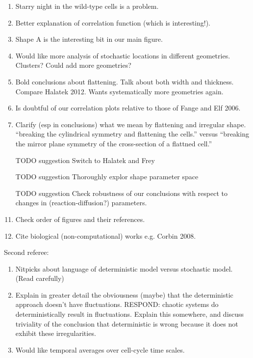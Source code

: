 \documentclass[letterpaper,twocolumn,amsmath,amssymb,pre]{revtex4-1}
\begin{document}
{\begin{enumerate}
    \emph{If you can't make it grow in a .3 micron (rigid) silicon channel,
      then we and you observe it growing in a .25 micron flexible
      channel, it presumably must be able to grow because it deformed
      the channel to larger than .3 microns.}
  \item Starry night in the wild-type cells is a problem.
  \item Better explanation of correlation function (which is
    interesting!).
  \item Shape A is the interesting bit in our main figure.
  \item Would like more analysis of stochastic locations in different
    geometries.  Clusters?  Could add more geometries?
  \item Bold conclusions about flattening.  Talk about both width and
    thickness.  Compare Halatek 2012.  Wants systematically more
    geometries again.
  \item Is doubtful of our correlation plots relative to those of
    Fange and Elf 2006.
  \item Clarify (esp in conclusions) what we mean by flattening and
    irregular shape.  ``breaking the cylindrical symmetry and
    flattening the cells.'' versus ``breaking the mirror plane
    symmetry of the cross-section of a flattned cell.''
  \item[TODO suggestion] Switch to Halatek and Frey
  \item[TODO suggestion] Thoroughly explor shape parameter space
  \item[TODO suggestion] Check robustness of our conclusions with
    respect to changes in (reaction-diffusion?) parameters.
  \item Check order of figures and their references.
  \item Cite biological (non-computational) works e.g. Corbin 2008.
  \end{enumerate}
  Second referee:
  \begin{enumerate}
  \item Nitpicks about language of deterministic model versus
    stochastic model.  (Read carefully)
  \item Explain in greater detail the obviousness (maybe) that the
    deterministic approach doesn't have fluctuations.  RESPOND:
    chaotic systems do deterministically result in fluctuations.
    Explain this somewhere, and discuss triviality of the conclusion
    that deterministic is wrong because it does not exhibit these
    irregularities.
  \item Would like temporal averages over cell-cycle time scales.

\end{enumerate}}
\end{document}
